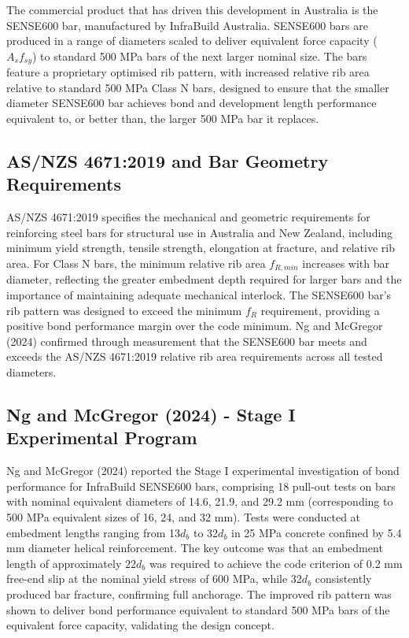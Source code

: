 The commercial product that has driven this development in Australia is the SENSE600 bar, manufactured by InfraBuild Australia. SENSE600 bars are produced in a range of diameters scaled to deliver equivalent force capacity ($A_s f_{sy}$) to standard 500 MPa bars of the next larger nominal size. The bars feature a proprietary optimised rib pattern, with increased relative rib area relative to standard 500 MPa Class N bars, designed to ensure that the smaller diameter SENSE600 bar achieves bond and development length performance equivalent to, or better than, the larger 500 MPa bar it replaces.

\subsection{AS/NZS 4671:2019 and Bar Geometry Requirements}
AS/NZS 4671:2019 specifies the mechanical and geometric requirements for reinforcing steel bars for structural use in Australia and New Zealand, including minimum yield strength, tensile strength, elongation at fracture, and relative rib area. For Class N bars, the minimum relative rib area $f_{R,min}$ increases with bar diameter, reflecting the greater embedment depth required for larger bars and the importance of maintaining adequate mechanical interlock. The SENSE600 bar's rib pattern was designed to exceed the minimum $f_{R}$ requirement, providing a positive bond performance margin over the code minimum. Ng and McGregor (2024) confirmed through measurement that the SENSE600 bar meets and exceeds the AS/NZS 4671:2019 relative rib area requirements across all tested diameters.

\subsection{Ng and McGregor (2024) - Stage I Experimental Program}
Ng and McGregor (2024) reported the Stage I experimental investigation of bond performance for InfraBuild SENSE600 bars, comprising 18 pull-out tests on bars with nominal equivalent diameters of 14.6, 21.9, and 29.2 mm (corresponding to 500 MPa equivalent sizes of 16, 24, and 32 mm). Tests were conducted at embedment lengths ranging from 13$d_b$ to 32$d_b$ in 25 MPa concrete confined by 5.4 mm diameter helical reinforcement. The key outcome was that an embedment length of approximately $22d_b$ was required to achieve the code criterion of 0.2 mm free-end slip at the nominal yield stress of 600 MPa, while 32$d_b$ consistently produced bar fracture, confirming full anchorage. The improved rib pattern was shown to deliver bond performance equivalent to standard 500 MPa bars of the equivalent force capacity, validating the design concept.

